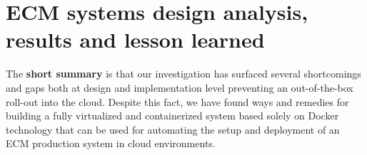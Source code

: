 \documentclass[EPiC]{easychair} %
\begin{document}
\section{ECM systems design analysis, results and lesson learned}
\label{analysis_and_results}
 The \textbf{short summary} is that our investigation has surfaced several shortcomings and gaps both at design and implementation level preventing an out-of-the-box roll-out into the cloud. Despite this fact, we have found ways and remedies for building a fully virtualized and containerized system based solely on Docker technology that can be used for automating the setup and deployment of an ECM production system in cloud environments. 
 
\end{document}
